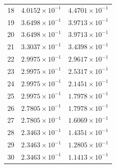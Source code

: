 \begin{table}[H]
\begin{tabular}{@{}rrr@{}}
18 & $4.0152\times10^{-1}$ & $4.4701\times10^{-1}$\\
19 & $3.6498\times10^{-1}$ & $3.9713\times10^{-1}$\\
20 & $3.6498\times10^{-1}$ & $3.9713\times10^{-1}$\\
21 & $3.3037\times10^{-1}$ & $3.4398\times10^{-1}$\\
22 & $2.9975\times10^{-1}$ & $2.9617\times10^{-1}$\\
23 & $2.9975\times10^{-1}$ & $2.5317\times10^{-1}$\\
24 & $2.9975\times10^{-1}$ & $2.1451\times10^{-1}$\\
25 & $2.9975\times10^{-1}$ & $1.7978\times10^{-1}$\\
26 & $2.7805\times10^{-1}$ & $1.7978\times10^{-1}$\\
27 & $2.7805\times10^{-1}$ & $1.6069\times10^{-1}$\\
28 & $2.3463\times10^{-1}$ & $1.4351\times10^{-1}$\\
29 & $2.3463\times10^{-1}$ & $1.2805\times10^{-1}$\\
30 & $2.3463\times10^{-1}$ & $1.1413\times10^{-1}$\\
\bottomrule
\end{tabular}
\end{table}

